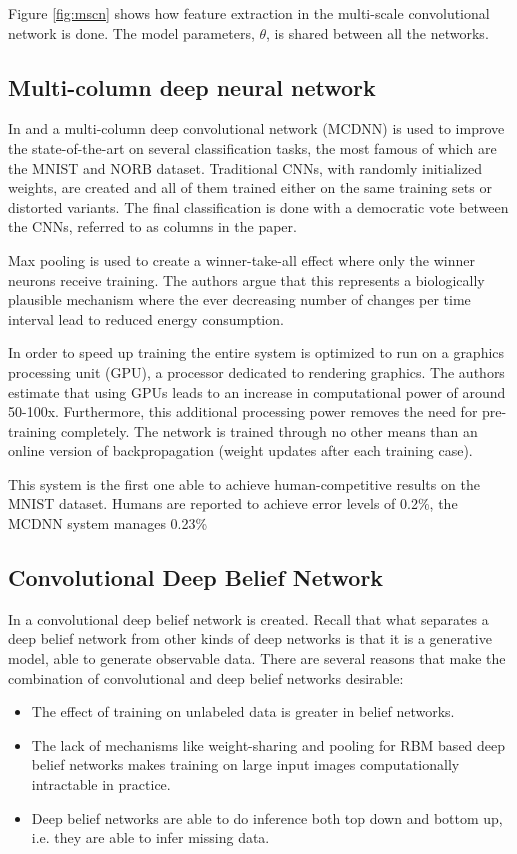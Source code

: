 \documentclass[11pt]{article}
\begin{document}
\newpage

Figure \ref{fig:mscn} shows how feature extraction in the multi-scale convolutional network is done.  The model parameters, $\theta$, is shared between all the networks.

\subsection{Multi-column deep neural network}
In \cite{ciresan} and \cite{ciresan2} a multi-column deep convolutional network (MCDNN) is used to improve the state-of-the-art on several classification tasks, the most famous of which are the MNIST and NORB dataset.  Traditional CNNs, with randomly initialized weights, are created and all of them trained either on the same training sets or distorted variants.  The final classification is done with a democratic vote between the CNNs, referred to as columns in the paper.

Max pooling is used to create a winner-take-all effect where only the winner neurons receive training.  The authors argue that this represents a biologically plausible mechanism where the ever decreasing number of changes per time interval lead to reduced energy consumption.

In order to speed up training the entire system is optimized to run on a graphics processing unit (GPU), a processor dedicated to rendering graphics. The authors estimate that using GPUs leads to an increase in computational power of around 50-100x.  Furthermore, this additional processing power removes the need for pre-training completely.  The network is trained through no other means than an online version of backpropagation (weight updates after each training case).

This system is the first one able to achieve human-competitive results on the MNIST dataset.  Humans are reported to achieve error levels of 0.2\%, the MCDNN system manages 0.23\%


\subsection{Convolutional Deep Belief Network}

In \cite{lee} a convolutional deep belief network is created.  Recall that what separates a deep belief network from other kinds of deep networks is that it is a generative model, able to generate observable data.  There are several reasons that make the combination of convolutional and deep belief networks desirable:
\begin{itemize}
 \item The effect of training on unlabeled data is greater in belief networks.
 \item The lack of mechanisms like weight-sharing and pooling for RBM based deep belief networks makes training on large input images computationally intractable in practice.
 \item Deep belief networks are able to do inference both top down and bottom up, i.e. they are able to infer missing data.
\end{itemize}
\end{document}
